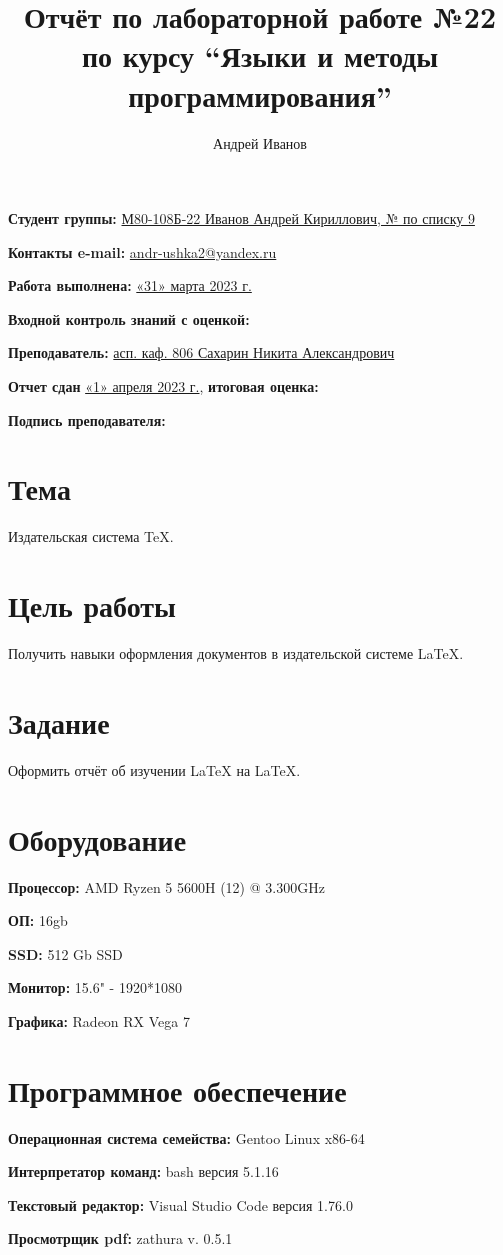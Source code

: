 \documentclass[12pt, letterpaper]{article}
\title{Отчёт по лабораторной работе №22 по курсу “Языки и методы программирования”}
\author{Андрей Иванов}
\begin{document}
\maketitle
\begin{description}
\item\textbf{Студент группы:} \underline{М80-108Б-22 Иванов Андрей Кириллович, № по списку 9}    
\item\textbf{Контакты e-mail:} \underline{andr-ushka2@yandex.ru}
\item\textbf{Работа выполнена:} \underline{«31» марта 2023 г.}
\item\textbf{Входной контроль знаний с оценкой:} 
\item\textbf{Преподаватель:} \underline{асп. каф. 806 Сахарин Никита Александрович}
\item\textbf{Отчет сдан} \underline{«1» апреля 2023 г.}, \textbf{итоговая оценка:} 
\item\textbf{Подпись преподавателя:} \underline{\hspace{3cm}}
\end{description}
\section{Тема}
Издательская система \TeX{}.
\section{Цель работы}
Получить навыки оформления документов в издательской системе \LaTeX{}.
\section{Задание}
Оформить отчёт об изучении \LaTeX{} на \LaTeX{}.
\section{Оборудование}
\begin{description}
\item\textbf{Процессор:} AMD Ryzen 5 5600H (12) @ 3.300GHz
\item\textbf{ОП:} 16gb
\item\textbf{SSD:} 512 Gb SSD
\item\textbf{Монитор:} 15.6" - 1920*1080
\item\textbf{Графика:} Radeon RX Vega 7
\end{description}
\section{Программное обеспечение}
\begin{description}
\item\textbf{Операционная система семейства:} Gentoo Linux x86-64
\item\textbf{Интерпретатор команд:} bash версия 5.1.16
\item\textbf{Текстовый редактор:} Visual Studio Code версия 1.76.0
\item\textbf{Просмотрщик pdf:} zathura v. 0.5.1
\end{description}
\end{document}
